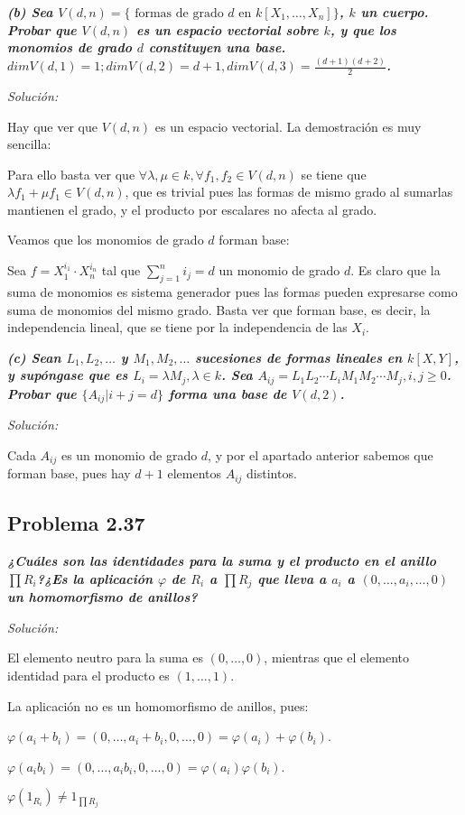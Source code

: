 \textit{\textbf{(b) Sea $V(d,n)=\{\text{ formas de grado } d \text{ en } k[X_1,\dots,X_n] \}$, $k$ un cuerpo. Probar que $V(d,n)$ es un espacio vectorial sobre $k$, y que los monomios de grado $d$ constituyen una base. $dim V(d,1)=1; dim V(d,2)=d+1, dim V(d,3)=\frac{(d+1)(d+2)}{2}$.}}

\textit{Solución: }

Hay que ver que $V(d,n)$ es un espacio vectorial. La demostración es muy sencilla:

Para ello basta ver que $\forall \lambda,\mu\in k, \forall f_1,f_2\in V(d,n)$ se tiene que $\lambda f_1+\mu f_1\in V(d,n)$, que es trivial pues las formas de mismo grado al sumarlas mantienen el grado, y el producto por escalares no afecta al grado.

Veamos que los monomios de grado $d$ forman base:

Sea $f= X_1^{i_1}\cdot X_n^{i_n}$ tal que $\sum_{j=1}^n i_j= d$ un monomio de grado $d$. Es claro que la suma de monomios es sistema generador pues las formas pueden expresarse como suma de monomios del mismo grado. Basta ver que forman base, es decir, la independencia lineal, que se tiene por la independencia de las $X_i$.

\textit{\textbf{(c) Sean $L_1,L_2,\dots$ y $M_1,M_2,\dots$ sucesiones de formas lineales en $k[X,Y]$, y supóngase que es $L_i=\lambda M_j,\lambda\in k$. Sea $A_{ij}=L_1L_2\cdots L_iM_1M_2\cdots M_j, i,j\ge 0$. Probar que $\{A_{ij}|i+j=d\}$ forma una base de $V(d,2)$. }}


\textit{Solución: }

Cada $A_{ij}$ es un monomio de grado $d$, y por el apartado anterior sabemos que forman base, pues hay $d+1$ elementos $A_{ij}$ distintos.


\subsection{Problema 2.37}
\textit{\textbf{¿Cuáles son las identidades para la suma y el producto en el anillo $\prod R_i$?¿Es la aplicación $\varphi $ de $R_i$ a $\prod R_j$ que lleva a $a_i$ a $(0,\dots,a_i,\dots,0)$ un homomorfismo de anillos?}}

\textit{Solución: }

El elemento neutro para la suma es $(0,\dots,0)$, mientras que el elemento identidad para el producto es $(1,\dots,1)$.

La aplicación no es un homomorfismo de anillos, pues:
\begin{itemize*}
\item $\varphi(a_i+b_i)=(0,\dots,a_i+b_i,0,\dots,0)=\varphi(a_i)+\varphi(b_i)$.
\item $\varphi(a_ib_i)=(0,\dots,a_ib_i,0,\dots,0)=\varphi(a_i)\varphi(b_i)$.
\item $\varphi(1_{R_i}) \neq 1_{\prod R_j}$
\end{itemize*}


